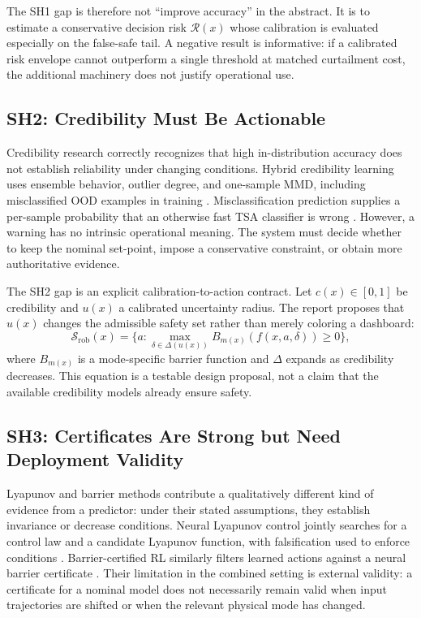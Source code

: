 \documentclass[conference]{IEEEtran}
\newcommand{\risk}{\mathcal{R}}
\newcommand{\safe}{\mathcal{S}}
\begin{document}
The SH1 gap is therefore not ``improve accuracy'' in the abstract. It is to estimate a conservative decision risk $\risk(x)$ whose calibration is evaluated especially on the false-safe tail. A negative result is informative: if a calibrated risk envelope cannot outperform a single threshold at matched curtailment cost, the additional machinery does not justify operational use.

\subsection{SH2: Credibility Must Be Actionable}

Credibility research correctly recognizes that high in-distribution accuracy does not establish reliability under changing conditions. Hybrid credibility learning uses ensemble behavior, outlier degree, and one-sample MMD, including misclassified OOD examples in training \cite{li2025}. Misclassification prediction supplies a per-sample probability that an otherwise fast TSA classifier is wrong \cite{bogodorova2024}. However, a warning has no intrinsic operational meaning. The system must decide whether to keep the nominal set-point, impose a conservative constraint, or obtain more authoritative evidence.

The SH2 gap is an explicit calibration-to-action contract. Let $c(x)\in[0,1]$ be credibility and $u(x)$ a calibrated uncertainty radius. The report proposes that $u(x)$ changes the admissible safety set rather than merely coloring a dashboard:
\begin{equation}
  \safe_{\mathrm{rob}}(x)=\{a: \max_{\delta\in\Delta(u(x))} B_{m(x)}(f(x,a,\delta))\geq0\},
  \label{eq:robustsafe}
\end{equation}
where $B_{m(x)}$ is a mode-specific barrier function and $\Delta$ expands as credibility decreases. This equation is a testable design proposal, not a claim that the available credibility models already ensure safety.

\subsection{SH3: Certificates Are Strong but Need Deployment Validity}

Lyapunov and barrier methods contribute a qualitatively different kind of evidence from a predictor: under their stated assumptions, they establish invariance or decrease conditions. Neural Lyapunov control jointly searches for a control law and a candidate Lyapunov function, with falsification used to enforce conditions \cite{zhao2022}. Barrier-certified RL similarly filters learned actions against a neural barrier certificate \cite{zhao2023}. Their limitation in the combined setting is external validity: a certificate for a nominal model does not necessarily remain valid when input trajectories are shifted or when the relevant physical mode has changed.
\end{document}
